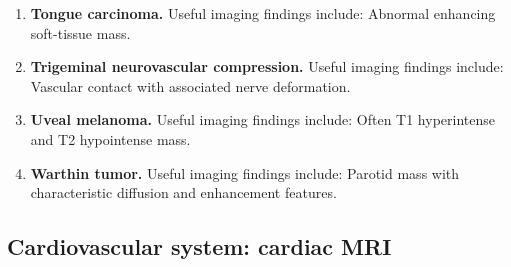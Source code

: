 \begin{enumerate}[leftmargin=*,itemsep=0.45em,topsep=0.4em]
\item \textbf{Tongue carcinoma.} Useful imaging findings include: Abnormal enhancing soft-tissue mass.
\item \textbf{Trigeminal neurovascular compression.} Useful imaging findings include: Vascular contact with associated nerve deformation.
\item \textbf{Uveal melanoma.} Useful imaging findings include: Often T1 hyperintense and T2 hypointense mass.
\item \textbf{Warthin tumor.} Useful imaging findings include: Parotid mass with characteristic diffusion and enhancement features.
\end{enumerate}

\subsection{Cardiovascular system: cardiac MRI}
